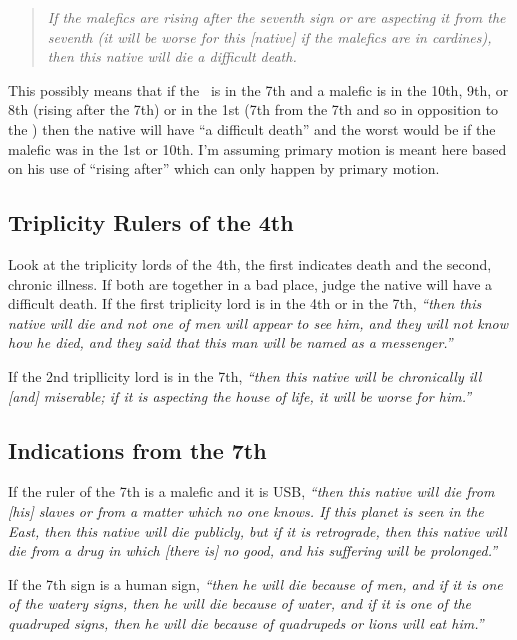 \begin{quote}
\textsl{ If the malefics are rising after the seventh sign or are aspecting it from the seventh (it will be worse for this [native] if the malefics are in cardines), then this native will die a difficult death.}
\end{quote}

This possibly means that if the \Moon\, is in the 7th and a malefic is in the 10th, 9th, or 8th (rising after the 7th) or in the 1st (7th from the 7th and so in opposition to the \Moon) then the native will have ``a difficult death'' and the worst would be if the malefic was in the 1st or 10th. I'm assuming primary motion is meant here based on his use of ``rising after'' which can only happen by primary motion.

\subsection{Triplicity Rulers of the 4th}

Look  at the triplicity lords of the 4th, the first indicates death and the second, chronic illness. If both are together in a bad place, judge the native will have a difficult death. If the first triplicity lord is in the 4th or in the 7th, \textsl{``then this native will die and not one of men will appear to see him, and they will not know how he died, and they said that this man will be named as a messenger.''}

If  the 2nd tripllicity lord is in the 7th, \textsl{``then this native will be chronically ill [and] miserable; if it is aspecting the house of life, it will be worse for him.''} 

\subsection{Indications from the 7th}

If  the ruler of the 7th is a malefic and it is USB, \textsl{``then this native will die from [his] slaves or from a matter which no one knows. If this planet is seen in the East, then this native will die publicly, but if it is retrograde, then this native will die from a drug in which [there is] no good, and his suffering will be prolonged.''}

If  the 7th sign is a human sign, \textsl{``then he will die because of men, and if it is one of the watery signs, then he will die because of water, and if it is one of the quadruped signs, then he will die because of quadrupeds or lions will eat him.''}

